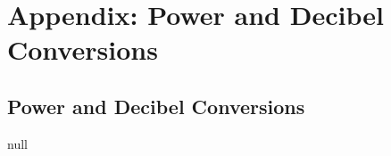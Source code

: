 \chapter{Appendix: Power and Decibel Conversions}
\label{app:power_db}

\section{Power and Decibel Conversions}
\label{sec:power_decibel}
null
